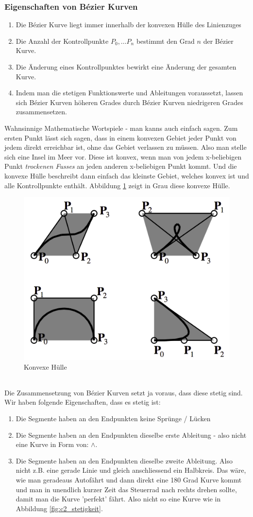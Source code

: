 \subsubsection{Eigenschaften von Bézier Kurven}
\begin{enumerate}
	\item Die Bézier Kurve liegt immer innerhalb der konvexen Hülle des Linienzuges
	\item Die Anzahl der Kontrollpunkte \(P_0, \dots P_n\) bestimmt den Grad \(n\) der Bézier Kurve.
	\item Die Änderung eines Kontrollpunktes bewirkt eine Änderung der gesamten Kurve.
	\item Indem man die stetigen Funktionswerte und Ableitungen voraussetzt, lassen sich Bézier Kurven höheren Grades durch Bézier Kurven niedrigeren Grades zusammensetzen.
\end{enumerate}
Wahnsinnige Mathematische Wortspiele - man kanns auch einfach sagen. Zum ersten Punkt lässt sich sagen, dass in einem konvexen Gebiet jeder Punkt von jedem direkt erreichbar ist, ohne das Gebiet verlassen zu müssen. Also man stelle sich eine Insel im Meer vor. Diese ist konvex, wenn man von jedem x-beliebigen Punkt \textit{trockenen Fusses} an jeden anderen x-beliebigen Punkt kommt. Und die konvexe Hülle beschreibt dann einfach das kleinste Gebiet, welches konvex ist und alle Kontrollpunkte enthält. Abbildung \ref{fig:konvexe_huelle} zeigt in Grau diese konvexe Hülle.
\begin{figure}[!ht]
	\centering
	\includegraphics[width=0.3\linewidth]{fig/konvexe_huelle}
	\caption{Konvexe Hülle}
	\label{fig:konvexe_huelle}
\end{figure}
\\ \newline
Die Zusammensetzung von Bézier Kurven setzt ja voraus, dass diese stetig sind. Wir haben folgende Eigenschaften, dass es stetig ist:
\begin{enumerate}
	\item Die Segmente haben an den Endpunkten keine Sprünge / Lücken
	\item Die Segmente haben an den Endpunkten dieselbe erste Ableitung - also nicht eine Kurve in Form von: \(\land\).
	\item Die Segmente haben an den Endpunkten dieselbe zweite Ableitung. Also nicht z.B. eine gerade Linie und gleich anschliessend ein Halbkreis. Das wäre, wie man geradeaus Autofährt und dann direkt eine 180 Grad Kurve kommt und man in unendlich kurzer Zeit das Steuerrad nach rechts drehen sollte, damit man die Kurve 'perfekt' fährt. Also nicht so eine Kurve wie in Abbildung \ref{fig:c2_stetigkeit}.
\end{enumerate}
